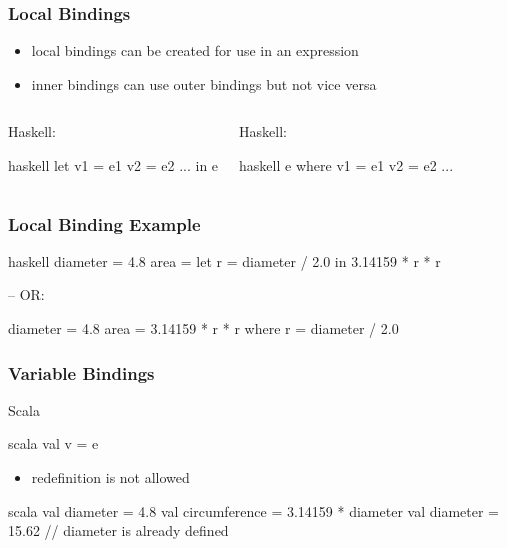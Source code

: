 \documentclass[dvipsnames]{beamer}
\theoremstyle{plain}
\begin{document}
\begin{frame}[fragile]
  \frametitle{Local Bindings}

  \begin{itemize}
    \item local bindings can be created for use in an expression
    \item inner bindings can use outer bindings but not vice versa
  \end{itemize}

  \begin{columns}[t]
    \begin{block}{Haskell: }
      \begin{pygments}{haskell}
let v1 = e1
    v2 = e2
    ...
in
    e
      \end{pygments}
    \end{block}

    \begin{block}{Haskell: }
      \begin{pygments}{haskell}
e
where v1 = e1
      v2 = e2
      ...
      \end{pygments}
    \end{block}
  \end{columns}
\end{frame}

\begin{frame}[fragile]
  \frametitle{Local Binding Example}

  \begin{example}[Haskell]
    \begin{pygments}{haskell}
diameter = 4.8
area = let r = diameter / 2.0
       in 3.14159 * r * r

-- OR:

diameter = 4.8
area = 3.14159 * r * r
       where r = diameter / 2.0
    \end{pygments}
  \end{example}
\end{frame}

\begin{frame}[fragile]
  \frametitle{Variable Bindings}

  \begin{block}{Scala}
    \begin{pygments}{scala}
val v = e
    \end{pygments}
  \end{block}

  \begin{itemize}
    \item redefinition is not allowed
  \end{itemize}

  \pause
  \bigskip
  \begin{example}
    \begin{pygments}{scala}
val diameter = 4.8
val circumference = 3.14159 * diameter
val diameter = 15.62    // diameter is already defined
    \end{pygments}
  \end{example}
\end{frame}
\end{document}
